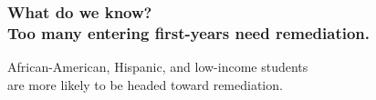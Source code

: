 \documentclass[14pt]{beamer}
\newcounter{a}
\newcounter{b}
\def\shadowradius{0.025\textwidth}
\def\zerodistance{1pt}
\newcommand\drawshadowbis[1]{
  \begin{pgfonlayer}{shadow}
    \fill[fill=white] ($(#1.south west)+(-\zerodistance,-\zerodistance)$) rectangle ($(#1.north east)+(\zerodistance,\zerodistance)$);

    \begin{scope}
      \clip ($(#1.south west)$) rectangle ++(-\shadowradius,-\shadowradius);
      \fill[fill=white,path fading=fade out]
        ($(#1.south west)$) circle (\shadowradius);
    \end{scope}

    \begin{scope}
      \clip ($(#1.south east)$) rectangle ++(\shadowradius,-\shadowradius);
      \fill[fill=white,path fading=fade out]
        ($(#1.south east)$) circle (\shadowradius);
    \end{scope}

    \begin{scope}
      \clip ($(#1.north west)$) rectangle ++(-\shadowradius,\shadowradius);
      \fill[fill=white,path fading=fade out]
        ($(#1.north west)$) circle (\shadowradius);
    \end{scope}

    \begin{scope}
      \clip ($(#1.north east)$) rectangle ++(\shadowradius,\shadowradius);
      \fill[fill=white,path fading=fade out]
        ($(#1.north east)$) circle (\shadowradius);
    \end{scope}

    \fill[path fading=fade up,fill=white] ($(#1.south west)+((0,-\shadowradius)$) rectangle ($(#1.south east)$);
    \fill[path fading=fade right,fill=white] ($(#1.south east)$) rectangle ($(#1.north east)+((\shadowradius,0)$);
    \fill[path fading=fade down,fill=white] ($(#1.north west)$) rectangle ($(#1.north east)+((0,\shadowradius)$);
    \fill[path fading=fade left,fill=white] ($(#1.south west)$) rectangle ($(#1.north west)+(-\shadowradius,0)$);
  \end{pgfonlayer}
}
\begin{document}
\begin{frame}
  \frametitle{What do we know? \\ Too many entering first-years need remediation.}


  African-American, Hispanic, and low-income students \\
  \quad are more likely to be headed toward remediation.
\end{frame}
\end{document}
